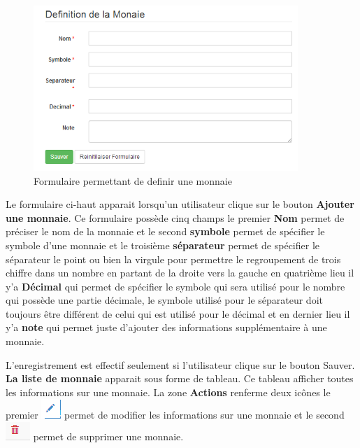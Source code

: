 \documentclass[12pt,a4paper]{report}
\begin{document}
\begin{figure}[h]
\begin{center}
\includegraphics[width=10cm]{pic/FormMonney.png}
\end{center}
\caption{Formulaire permettant de definir une monnaie}
\label{Formulaire permettant de definir une monnaie}
\end{figure}
\newpage
Le formulaire ci-haut apparait lorsqu'un utilisateur clique sur le bouton \textbf{Ajouter une monnaie}. Ce formulaire possède cinq champs le premier \textbf{Nom} permet de préciser le nom de la monnaie et le second \textbf{symbole} permet de spécifier le symbole d'une monnaie et le troisième \textbf{séparateur} permet de spécifier le séparateur le point ou bien la virgule pour permettre le regroupement de trois chiffre dans un nombre en partant de la droite vers la gauche en quatrième lieu il y'a \textbf{Décimal} qui permet de spécifier le symbole qui sera utilisé pour le nombre qui possède une partie décimale, le symbole utilisé pour le séparateur doit toujours être différent de celui qui est utilisé pour le décimal et en dernier lieu il y'a \textbf{note} qui permet juste d'ajouter des informations supplémentaire à une monnaie.

L'enregistrement est effectif seulement si l'utilisateur clique sur le bouton Sauver. \textbf{La liste de monnaie} apparait sous forme de tableau. Ce tableau afficher toutes les informations sur une monnaie. La zone \textbf{Actions} renferme deux icônes le premier \includegraphics[scale=0.7]{pic/EditUser.png}  permet de modifier les informations sur une monnaie et le second \includegraphics[scale=0.7]{pic/DeleteWRed.png} permet de supprimer une monnaie.
\end{document}
